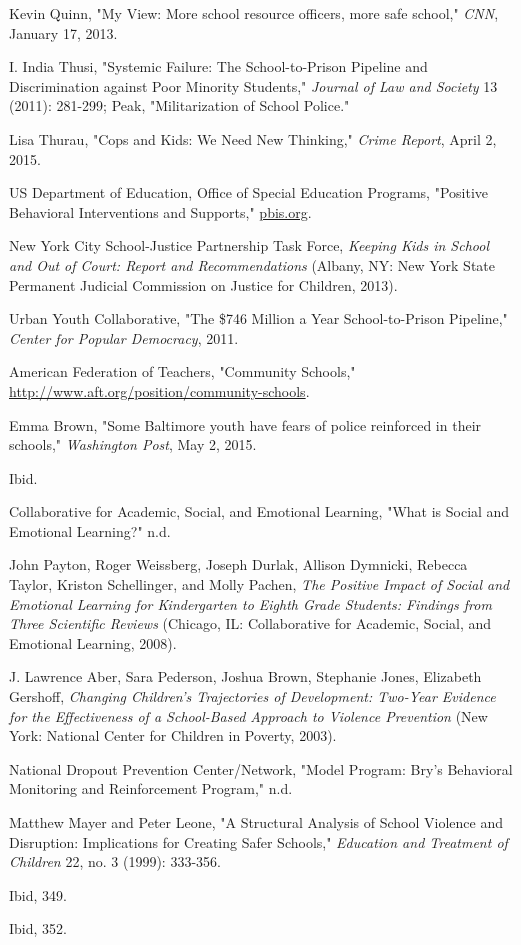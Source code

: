 \documentclass[fontset=fandol, a4paper, 12pt, openright]{ctexbook}
\begin{document}
\begin{enumerate}[label={[\arabic*]}]
    \item Kevin Quinn, "My View: More school resource officers, more safe school," \textit{CNN}, January 17, 2013.
    \item I. India Thusi, "Systemic Failure: The School-to-Prison Pipeline and Discrimination against Poor Minority Students," \textit{Journal of Law and Society} 13 (2011): 281-299; Peak, "Militarization of School Police."
    \item Lisa Thurau, "Cops and Kids: We Need New Thinking," \textit{Crime Report}, April 2, 2015.
    \item US Department of Education, Office of Special Education Programs, "Positive Behavioral Interventions and Supports," \url{pbis.org}.
    \item New York City School-Justice Partnership Task Force, \textit{Keeping Kids in School and Out of Court: Report and Recommendations} (Albany, NY: New York State Permanent Judicial Commission on Justice for Children, 2013).
    \item Urban Youth Collaborative, "The \$746 Million a Year School-to-Prison Pipeline," \textit{Center for Popular Democracy}, 2011.
    \item American Federation of Teachers, "Community Schools," \url{http://www.aft.org/position/community-schools}.
    \item Emma Brown, "Some Baltimore youth have fears of police reinforced in their schools," \textit{Washington Post}, May 2, 2015.
    \item Ibid.
    \item Collaborative for Academic, Social, and Emotional Learning, "What is Social and Emotional Learning?" n.d.
    \item John Payton, Roger Weissberg, Joseph Durlak, Allison Dymnicki, Rebecca Taylor, Kriston Schellinger, and Molly Pachen, \textit{The Positive Impact of Social and Emotional Learning for Kindergarten to Eighth Grade Students: Findings from Three Scientific Reviews} (Chicago, IL: Collaborative for Academic, Social, and Emotional Learning, 2008).
    \item J. Lawrence Aber, Sara Pederson, Joshua Brown, Stephanie Jones, Elizabeth Gershoff, \textit{Changing Children's Trajectories of Development: Two-Year Evidence for the Effectiveness of a School-Based Approach to Violence Prevention} (New York: National Center for Children in Poverty, 2003).
    \item National Dropout Prevention Center/Network, "Model Program: Bry's Behavioral Monitoring and Reinforcement Program," n.d.
    \item Matthew Mayer and Peter Leone, "A Structural Analysis of School Violence and Disruption: Implications for Creating Safer Schools," \textit{Education and Treatment of Children} 22, no. 3 (1999): 333-356.
    \item Ibid, 349.
    \item Ibid, 352.
\end{enumerate}
\end{document}
